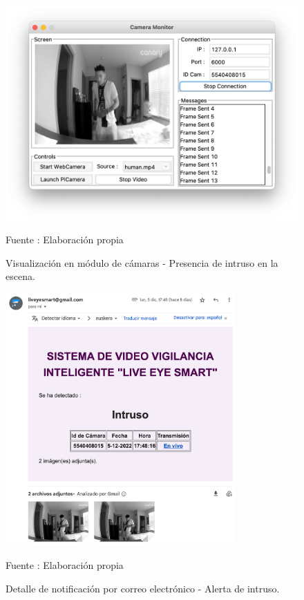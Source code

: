 \begin{figure}[H]
    \begin{center}
        \includegraphics[width=12cm]{img/capitulo_6/human.png}
    \end{center}
    \begin{center}
        \caption{Visualización en módulo de cámaras - Presencia de intruso en la escena.}
        Fuente : Elaboración propia
    \end{center}
\end{figure}

\begin{figure}[H]
    \begin{center}
        \includegraphics[width=8.8cm]{img/capitulo_6/mail_human.png}
    \end{center}
    \begin{center}
        \caption{Detalle de notificación por correo electrónico - Alerta de intruso.}
        Fuente : Elaboración propia
    \end{center}
\end{figure}


